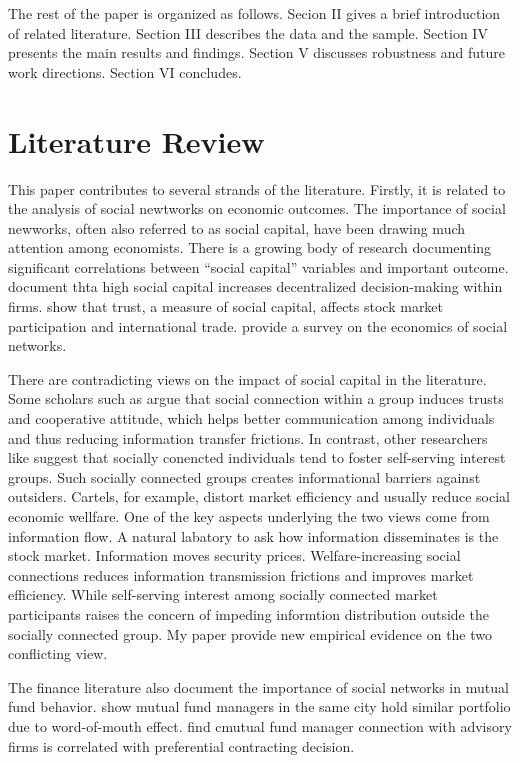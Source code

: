 \documentclass[11pt]{article}
\begin{document}
\begin{doublespace}
The rest of the paper is organized as follows. Secion II gives a brief introduction of related literature. Section III describes the data and the sample. Section IV presents the main results and findings. Section V discusses robustness and future work directions. Section VI concludes. 



\section{Literature Review}
This paper contributes to several strands of the literature. Firstly, it is related to the analysis of social newtworks on economic outcomes. The importance of social newworks, often also referred to as social capital, have been drawing much attention among economists. There is a growing body of research documenting significant correlations between ``social capital'' variables and important outcome. \cite{bloom2012organization} document thta high social capital increases decentralized decision-making within firms. \cite{guiso2004role} show that trust, a measure of social capital, affects stock market participation and international trade. \cite{jackson2005economics} provide a survey on the economics of social networks. 

There are contradicting views on the impact of social capital in the literature. Some scholars such as \cite{putnam1994making} argue that social connection within a group induces trusts and cooperative attitude, which helps better communication among individuals and thus reducing information transfer frictions. In contrast, other researchers like \cite{olson1982rise} suggest that socially conencted individuals tend to foster self-serving interest groups. Such socially connected groups creates informational barriers against outsiders. Cartels, for example, distort market efficiency and usually reduce social economic wellfare. One of the key aspects underlying the two views come from information flow. A natural labatory to ask how information disseminates is the stock market. Information moves security prices. Welfare-increasing social connections reduces information transmission frictions and improves market efficiency. While self-serving interest among socially connected market participants raises the concern of impeding informtion distribution outside the socially connected group.
My paper provide new empirical evidence on the two conflicting view.

The finance literature also document the importance of social networks in mutual fund behavior. \cite{hong2005thy} show mutual fund managers in the same city hold similar portfolio due to word-of-mouth effect. \cite{kuhnen2005social} find cmutual fund manager connection with advisory firms is correlated with preferential contracting decision. 


\end{doublespace}
\end{document}
